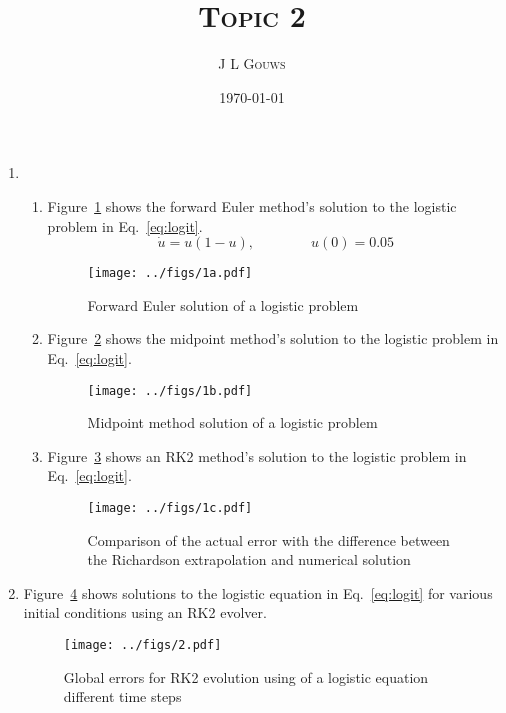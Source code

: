 \documentclass[12pt,a4]{article}
\title{
\textsc{Topic 2}
}
\author{\textsc{J L Gouws}
}
\date{\today
\\[1cm]}
\begin{document}
\thispagestyle{empty}

\maketitle

\begin{enumerate}
  \item
    \begin{enumerate}
      \item
        Figure~\ref{fig:1a} shows the forward Euler method's solution to the logistic problem in Eq.~\ref{eq:logit}.
        \begin{equation}
          \dot u = u (1 - u), \qquad \qquad u(0) = 0.05
          \label{eq:logit}
        \end{equation}
        \begin{figure}[H]
          \centering
          \texttt{[image: ../figs/1a.pdf]}
          \caption{Forward Euler solution of a logistic problem}
          \label{fig:1a}
        \end{figure}

      \item
        Figure~\ref{fig:1b} shows the midpoint method's solution to the logistic problem in Eq.~\ref{eq:logit}.

        \begin{figure}[H]
          \centering
          \texttt{[image: ../figs/1b.pdf]}
          \caption{Midpoint method solution of a logistic problem}
          \label{fig:1b}
        \end{figure}

      \item
        Figure~\ref{fig:1c} shows an RK2 method's solution to the logistic problem in Eq.~\ref{eq:logit}.
        \begin{figure}[H]
          \centering
          \texttt{[image: ../figs/1c.pdf]}
          \caption{Comparison of the actual error with the difference between the Richardson extrapolation and numerical solution}
          \label{fig:1c}
        \end{figure}

    \end{enumerate}
  \item
    Figure~\ref{fig:2} shows solutions to the logistic equation in Eq.~\ref{eq:logit} for various initial conditions using an RK2 evolver.
    \begin{figure}[H]
      \centering
      \texttt{[image: ../figs/2.pdf]}
      \caption{Global errors for RK2 evolution using of a logistic equation different time steps}
      \label{fig:2}
    \end{figure}


\end{enumerate}
\end{document}
